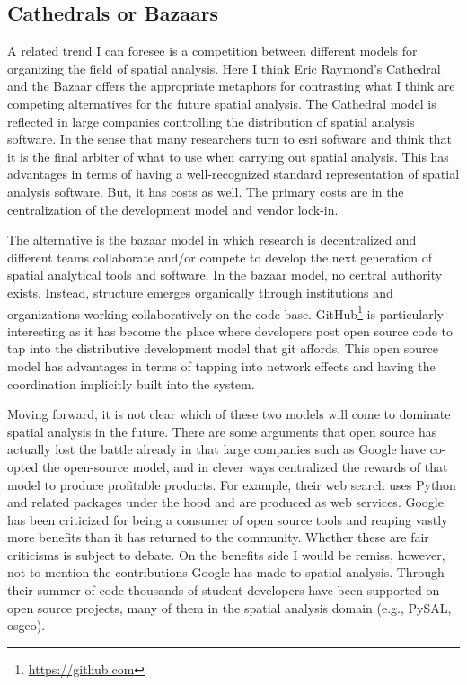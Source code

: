 \documentclass[11pt]{article}
\begin{document}
\subsection{Cathedrals or Bazaars}
\label{sec:orgbb69af0}
A related trend I can foresee is a competition between different models for
organizing the field of spatial analysis. Here I think Eric Raymond's Cathedral
and the Bazaar \cite{raymond_cathedral_1999-2} offers the appropriate
metaphors for contrasting what I think are competing alternatives for the
future spatial analysis. The Cathedral model is reflected in large companies
controlling the distribution of spatial analysis software. In the sense that
many researchers turn to esri software and think that it is the final arbiter
of what to use when carrying out spatial analysis. This has advantages in terms
of having a well-recognized standard representation of spatial analysis
software. But, it has costs as well. The primary costs are in the
centralization of the development model and vendor lock-in.

The alternative is the bazaar model in which research is decentralized and
different teams collaborate and/or compete to develop the next generation of
spatial analytical tools and software. In the bazaar model, no central authority
exists. Instead, structure emerges organically through institutions and
organizations working collaboratively on the code base. 
GitHub\footnote{\url{https://github.com}} is particularly interesting as it has
become the place where developers post open source code to tap into the
distributive development model that git affords. This open source model has
advantages in terms of tapping into network effects and having the coordination
implicitly built into the system.

Moving forward, it is not clear which of these two models will come to dominate
spatial analysis in the future. There are some arguments that open source has
actually lost the battle already \cite{Mark_2018} in that large companies such
as Google have co-opted the open-source model, and in clever ways centralized the
rewards of that model to produce profitable products. For example, their
web search uses Python and related packages under the hood and are produced as
web services. Google has been criticized for being a consumer of open source
tools and reaping vastly more benefits than it has returned to the community.
Whether these are fair criticisms is subject to debate. On the benefits
side I would be remiss, however, not to mention the contributions Google has
made to spatial analysis. Through their summer of code thousands of student
developers have been supported on open source projects, many of them in the
spatial analysis domain (e.g., PySAL, osgeo).
\end{document}
